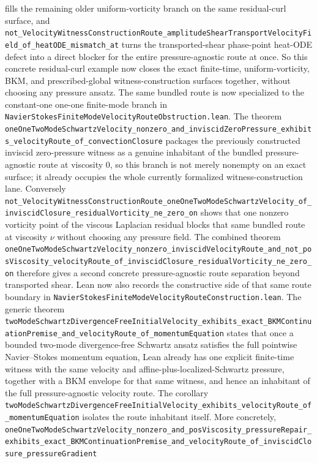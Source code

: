 \documentclass[11pt]{article}
\theoremstyle{remark}
\begin{document}
fills the remaining older uniform-vorticity branch on the same residual-curl
surface, and
\texttt{not\_VelocityWitnessConstructionRoute\_amplitudeShearTransportVelocityField\_of\_heatODE\_mismatch\_at}
turns the transported-shear phase-point heat-ODE defect into a direct blocker
for the entire pressure-agnostic route at once.  So this concrete residual-curl
example now closes the exact finite-time, uniform-vorticity, BKM, and
prescribed-global witness-construction surfaces together, without choosing any
pressure ansatz.
The same bundled route is now specialized to the constant-one one-one
finite-mode branch in
\texttt{NavierStokesFiniteModeVelocityRouteObstruction.lean}.  The theorem
\texttt{oneOneTwoModeSchwartzVelocity\_nonzero\_and\_inviscidZeroPressure\_exhibits\_velocityRoute\_of\_convectionClosure}
packages the previously constructed inviscid zero-pressure witness as a
genuine inhabitant of the bundled pressure-agnostic route at viscosity \(0\),
so this branch is not merely nonempty on an exact surface; it already occupies
the whole currently formalized witness-construction lane.  Conversely
\texttt{not\_VelocityWitnessConstructionRoute\_oneOneTwoModeSchwartzVelocity\_of\_inviscidClosure\_residualVorticity\_ne\_zero\_on}
shows that one nonzero vorticity point of the viscous Laplacian residual
blocks that same bundled route at viscosity \(\nu\) without choosing any
pressure field.  The combined theorem
\texttt{oneOneTwoModeSchwartzVelocity\_nonzero\_inviscidVelocityRoute\_and\_not\_posViscosity\_velocityRoute\_of\_inviscidClosure\_residualVorticity\_ne\_zero\_on}
therefore gives a second concrete pressure-agnostic route separation beyond
transported shear.
Lean now also records the constructive side of that same route boundary in
\texttt{NavierStokesFiniteModeVelocityRouteConstruction.lean}.  The generic
theorem
\texttt{twoModeSchwartzDivergenceFreeInitialVelocity\_exhibits\_exact\_BKMContinuationPremise\_and\_velocityRoute\_of\_momentumEquation}
states that once a bounded two-mode divergence-free Schwartz ansatz satisfies
the full pointwise Navier--Stokes momentum equation, Lean already has one
explicit finite-time witness with the same velocity and
affine-plus-localized-Schwartz pressure, together with a BKM envelope for that
same witness, and hence an inhabitant of the full pressure-agnostic velocity
route.  The corollary
\texttt{twoModeSchwartzDivergenceFreeInitialVelocity\_exhibits\_velocityRoute\_of\_momentumEquation}
isolates the route inhabitant itself.  More concretely,
\texttt{oneOneTwoModeSchwartzVelocity\_nonzero\_and\_posViscosity\_pressureRepair\_exhibits\_exact\_BKMContinuationPremise\_and\_velocityRoute\_of\_inviscidClosure\_pressureGradient}
\end{document}
